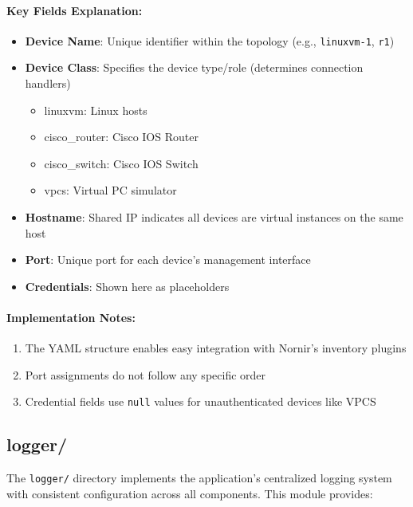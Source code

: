         \paragraph{Key Fields Explanation:}
        \begin{itemize}
            \item \textbf{Device Name}: Unique identifier within the topology (e.g., \texttt{linuxvm-1}, \texttt{r1})
            \item \textbf{Device Class}: Specifies the device type/role (determines connection handlers)
            \begin{itemize}
                \item linuxvm: Linux hosts
                \item cisco\_router: Cisco IOS Router
                \item cisco\_switch: Cisco IOS Switch
                \item vpcs: Virtual PC simulator
            \end{itemize}
            \item \textbf{Hostname}: Shared IP indicates all devices are virtual instances on the same host
            \item \textbf{Port}: Unique port for each device's management interface
            \item \textbf{Credentials}: Shown here as placeholders 
        \end{itemize}

        \paragraph{Implementation Notes:}
        \begin{enumerate}
            \item The YAML structure enables easy integration with Nornir's inventory plugins
            \item Port assignments do not follow any specific order
            \item Credential fields use \texttt{null} values for unauthenticated devices like VPCS
        \end{enumerate}



    \subsection{logger/}
        The \texttt{logger/} directory implements the application's centralized logging system with consistent 
        configuration across all components. This module provides:

